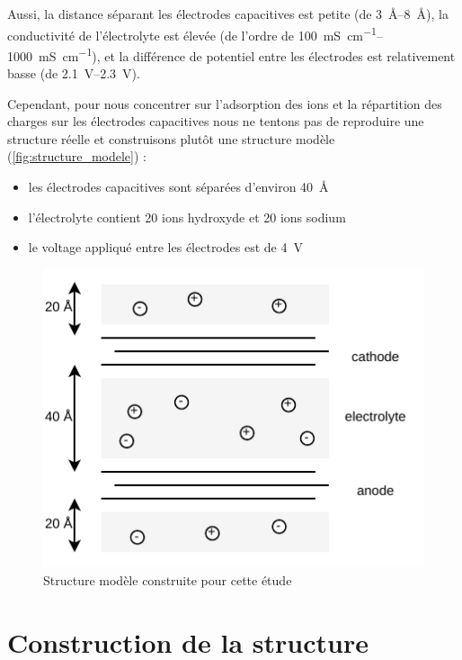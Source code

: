 \documentclass[a4paper, 11pt]{article}
\begin{document}
Aussi, la distance séparant les électrodes capacitives est petite (de \qtyrange{3}{8}{\angstrom}), la conductivité de l'électrolyte est élevée (de l'ordre de \qtyrange{100}{1000}{\milli \siemens \per \centi \meter}), et la différence de potentiel entre les électrodes est relativement basse (de \qtyrange{2.1}{2.3}{\volt}).

Cependant, pour nous concentrer sur l'adsorption des ions et la répartition des charges sur les électrodes capacitives nous ne tentons pas de reproduire une structure réelle et construisons plutôt une structure modèle (\autoref{fig:structure_modele}) :
\begin{itemize}
    \item les électrodes capacitives sont séparées d'environ \qty{40}{\angstrom}
    \item l'électrolyte contient \num{20} ions hydroxyde et \num{20} ions sodium
    \item le voltage appliqué entre les électrodes est de \qty{4}{\volt}
\end{itemize}

\begin{figure}[htpb]
    \centering
    \includegraphics{ch-sc-structure_modele.pdf}
    \caption{Structure modèle construite pour cette étude}
    \label{fig:structure_modele}
\end{figure}


\section{Construction de la structure}
\end{document}
